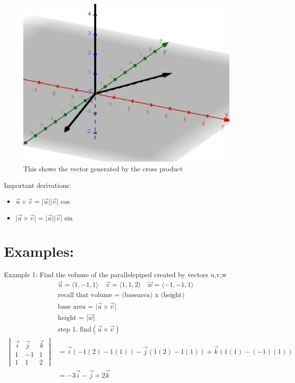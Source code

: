 \documentclass{article}
\newcommand{\abs}[1]{\lvert#1\rvert} %
\newcommand{\vecgen}[3]{\langle #1, #2, #3 \rangle} %
\begin{document}
\begin{figure}[H]
    \includegraphics[scale=.5,trim=0 0 0 0]{crossProd.png} %
    \caption{This shows the vector generated by the cross product}
\end{figure}

Important derivations: 
\begin{itemize}
    \item $\vec{u} \times \vec{v} = \abs{\vec{u}}\abs{\vec{v}}\cos$
    \item $\abs{\vec{u} \times \vec{v}} = \abs{\vec{u}} \abs{\vec{v}}\sin$
\end{itemize}

\section*{Examples:}

Example 1: Find the volume of the parallelepiped created by vectors u,v,w
\begin{align*}
    &\vec{u} = \vecgen{1}{-1}{1} \quad
    \vec{v} = \vecgen{1}{1}{2} \quad
    \vec{w} = \vecgen{-1}{-1}{1} \\
    &\text{recall that volume = (basearea) x (height)}\\
    &\text{base area = } \abs{\vec{u} \times \vec{v}} \\
    &\text{height = } \abs{\vec{w}} \\
    &\text{step 1. find} (\vec{u} \times \vec{v})\\
    \begin{vmatrix}
        \vec{i} & \vec{j} & \vec{k} \\
        1 & -1 & 1 \\
        1 & 1 & 2
    \end{vmatrix}
    &= \vec{i}(-1(2) - 1(1)) - \vec{j}(1(2) - 1(1)) + \vec{k}(1(1) - (-1)(1)) \\
    &= -3\vec{i} - \vec{j} + 2\vec{k} \\
\end{align*}
\end{document}
